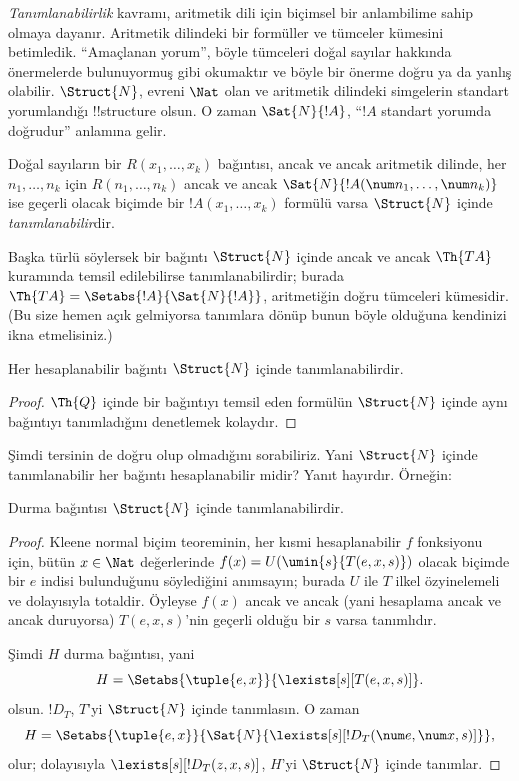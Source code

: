 



\emph{Tanımlanabilirlik} kavramı, aritmetik dili için biçimsel bir anlambilime
sahip olmaya dayanır. Aritmetik dilindeki bir formüller ve tümceler kümesini
betimledik. ``Amaçlanan yorum'', böyle tümceleri doğal sayılar hakkında
önermelerde bulunuyormuş gibi okumaktır ve böyle bir önerme doğru ya da yanlış
olabilir. $\Struct{N}$, evreni $\Nat$ olan ve aritmetik dilindeki simgelerin
standart yorumlandığı !!{structure} olsun. O zaman $\Sat{N}{!A}$, ``$!A$
standart yorumda doğrudur'' anlamına gelir.

\begin{defn}
Doğal sayıların bir $R(x_1,\dots,x_k)$ bağıntısı, ancak ve ancak aritmetik
dilinde, her $n_1,\dots,n_k$ için $R(n_1,\dots,n_k)$ ancak ve ancak
$\Sat{N}{!A(\num n_1,\dots,\num n_k)}$ ise geçerli olacak biçimde bir
$!A(x_1,\dots,x_k)$ formülü varsa $\Struct{N}$ içinde \emph{tanımlanabilir}dir.
\end{defn}

Başka türlü söylersek bir bağıntı $\Struct{N}$ içinde ancak ve ancak
$\Th{TA}$ kuramında temsil edilebilirse tanımlanabilirdir; burada
$\Th{TA} = \Setabs{!A}{\Sat{N}{!A}}$, aritmetiğin doğru tümceleri kümesidir.
(Bu size hemen açık gelmiyorsa tanımlara dönüp bunun böyle olduğuna kendinizi
ikna etmelisiniz.)

\begin{lem}
Her hesaplanabilir bağıntı $\Struct{N}$ içinde tanımlanabilirdir.
\end{lem}

\begin{proof}
$\Th{Q}$ içinde bir bağıntıyı temsil eden formülün $\Struct{N}$ içinde aynı
bağıntıyı tanımladığını denetlemek kolaydır.
\end{proof}

Şimdi tersinin de doğru olup olmadığını sorabiliriz. Yani $\Struct{N}$ içinde
tanımlanabilir her bağıntı hesaplanabilir midir? Yanıt hayırdır. Örneğin:

\begin{lem}
Durma bağıntısı $\Struct{N}$ içinde tanımlanabilirdir.
\end{lem}

\begin{proof}
Kleene normal biçim teoreminin, her kısmi hesaplanabilir $f$ fonksiyonu için,
bütün $x \in \Nat$ değerlerinde $f(x)=U(\umin{s}{T(e,x,s)})$ olacak biçimde
bir $e$ indisi bulunduğunu söylediğini anımsayın; burada $U$ ile $T$ ilkel
özyinelemeli ve dolayısıyla totaldir. Öyleyse $f(x)$ ancak ve ancak
(yani hesaplama ancak ve ancak duruyorsa) $T(e,x,s)$'nin geçerli olduğu bir
$s$ varsa tanımlıdır.

Şimdi $H$ durma bağıntısı, yani
\[
H = \Setabs{\tuple{e,x}}{\lexists[s][T(e, x, s)]}.
\]
olsun. $!D_T$, $T$'yi $\Struct{N}$ içinde tanımlasın. O zaman
\[
H = \Setabs{\tuple{e,x}}{\Sat{N}{\lexists[s][!D_T(\num e, \num x, s)]}},
\]
olur; dolayısıyla $\lexists[s][!D_T(z,x,s)]$, $H$'yi $\Struct{N}$ içinde
tanımlar.
\end{proof}

